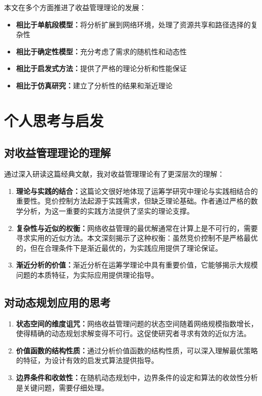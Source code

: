 \documentclass[
  10pt
]{article}
\begin{document}
本文在多个方面推进了收益管理理论的发展：

\begin{itemize}
\item \textbf{相比于单航段模型：}将分析扩展到网络环境，处理了资源共享和路径选择的复杂性
\item \textbf{相比于确定性模型：}充分考虑了需求的随机性和动态性
\item \textbf{相比于启发式方法：}提供了严格的理论分析和性能保证
\item \textbf{相比于仿真研究：}建立了分析性的结果和渐近理论
\end{itemize}

\section{个人思考与启发}

\subsection{对收益管理理论的理解}

通过深入研读这篇经典文献，我对收益管理理论有了更深层次的理解：

\begin{enumerate}
\item \textbf{理论与实践的结合：}这篇论文很好地体现了运筹学研究中理论与实践相结合的重要性。竞价控制方法起源于实践需求，但缺乏理论基础。作者通过严格的数学分析，为这一重要的实践方法提供了坚实的理论支撑。

\item \textbf{复杂性与近似的权衡：}网络收益管理的最优解通常在计算上是不可行的，需要寻求实用的近似方法。本文深刻揭示了这种权衡：虽然竞价控制不是严格最优的，但在合理条件下是渐近最优的，为实践应用提供了理论保证。

\item \textbf{渐近分析的价值：}渐近分析在运筹学理论中具有重要价值，它能够揭示大规模问题的本质特征，为实际应用提供理论指导。
\end{enumerate}

\subsection{对动态规划应用的思考}

\begin{enumerate}
\item \textbf{状态空间的维度诅咒：}网络收益管理问题的状态空间随着网络规模指数增长，使得精确的动态规划求解变得不可行。这促使研究者寻求有效的近似方法。

\item \textbf{价值函数的结构性质：}通过分析价值函数的结构性质，可以深入理解最优策略的特征，为设计有效的启发式算法提供指导。

\item \textbf{边界条件和收敛性：}在随机动态规划中，边界条件的设定和算法的收敛性分析是关键问题，需要仔细处理。
\end{enumerate}
\end{document}
